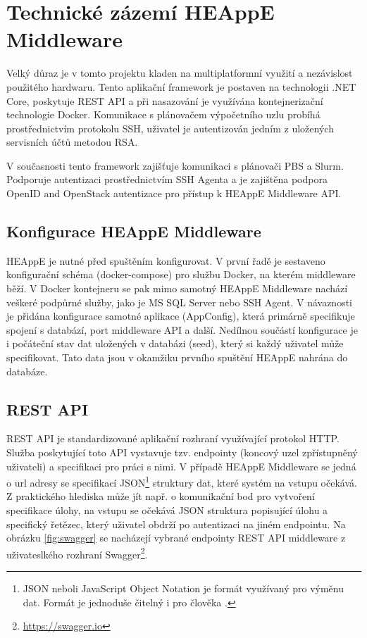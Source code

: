 \section{Technické zázemí HEAppE Middleware}
Velký důraz je v tomto projektu kladen na multiplatformní využití a nezávislost použitého hardwaru. Tento aplikační framework je postaven na technologii .NET Core, poskytuje REST API a při nasazování je využívána kontejnerizační technologie Docker. Komunikace s plánovačem výpočetního uzlu probíhá prostřednictvím protokolu SSH, uživatel je autentizován jedním z uložených servisních účtů metodou RSA.

V současnosti tento framework zajišťuje komunikaci s plánovači PBS a Slurm. Podporuje autentizaci prostřednictvím SSH Agenta a je zajištěna podpora OpenID and OpenStack autentizace pro přístup k HEAppE Middleware API.

\subsection{Konfigurace HEAppE Middleware}
HEAppE je nutné před spuštěním konfigurovat. V první řadě je sestaveno konfigurační schéma (docker-compose) pro službu Docker, na kterém middleware běží. V Docker kontejneru se pak mimo samotný HEAppE Middleware nachází veškeré podpůrné služby, jako je MS SQL Server nebo SSH Agent. V návaznosti je přidána konfigurace samotné aplikace (AppConfig), která primárně specifikuje spojení s databází, port middleware API a další. Nedílnou součástí konfigurace je i počáteční stav dat uložených v databázi (seed), který si každý uživatel může specifikovat. Tato data jsou v okamžiku prvního spuštění HEAppE nahrána do databáze.

\subsection{REST API}
REST API je standardizované aplikační rozhraní využívající protokol HTTP. Služba poskytující toto API vystavuje tzv. endpointy (koncový uzel zpřístupněný uživateli) a specifikaci pro práci s nimi. V případě HEAppE Middleware se jedná o url adresy se specifikací JSON\footnote{JSON neboli JavaScript Object Notation je formát využívaný pro výměnu dat. Formát je jednoduše čitelný i pro člověka \cite{lJoeVuQg92zsjaAe}.} struktury dat, které systém na vstupu očekává. Z praktického hlediska může jít např. o komunikační bod pro vytvoření specifikace úlohy, na vstupu se očekává JSON struktura popisující úlohu a specifický řetězec, který uživatel obdrží po autentizaci na jiném endpointu. Na obrázku \ref{fig:swagger} se nacházejí vybrané endpointy REST API middleware z uživateslkého rozhraní Swagger\footnote{\href{https://swagger.io}{https://swagger.io}}.


